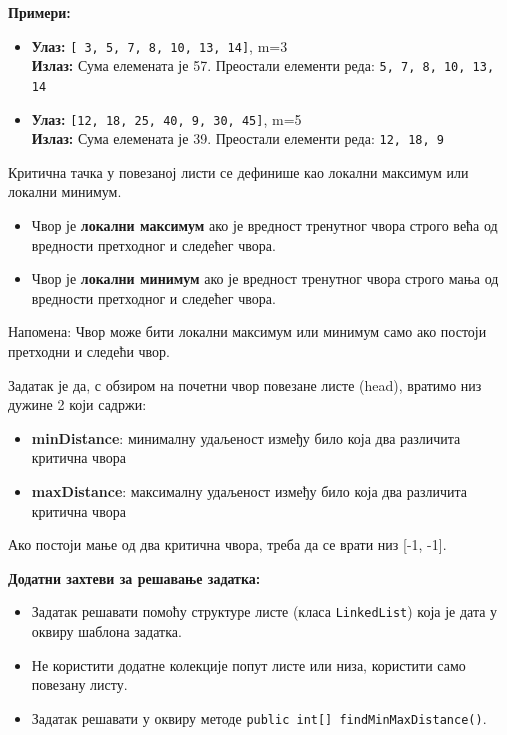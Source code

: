 \textbf{Примери:}
\begin{itemize}
    \item \textbf{Улаз:} \texttt{[ 3, 5, 7, 8, 10, 13, 14]}, m=3 \\
          \textbf{Излаз:} Сума елемената је 57. Преостали елементи реда: \texttt{5, 7, 8, 10, 13, 14}
    \item \textbf{Улаз:} \texttt{[12, 18, 25, 40, 9, 30, 45]}, m=5 \\
          \textbf{Излаз:} Сума елемената је 39. Преостали елементи реда: \texttt{12, 18, 9}
\end{itemize}



Критична тачка у повезаној листи се дефинише као локални максимум или локални минимум.

\begin{itemize}
    \item Чвор је \textbf{локални максимум} ако је вредност тренутног чвора строго већа од вредности претходног и следећег чвора.
    \item Чвор је \textbf{локални минимум} ако је вредност тренутног чвора строго мања од вредности претходног и следећег чвора.
\end{itemize}

Напомена: Чвор може бити локални максимум или минимум само ако постоји претходни и следећи чвор.

Задатак је да, с обзиром на почетни чвор повезане листе (head), вратимо низ дужине 2 који садржи:

\begin{itemize}
    \item \textbf{minDistance}: минималну удаљеност између било која два различита критична чвора
    \item \textbf{maxDistance}: максималну удаљеност између било која два различита критична чвора
\end{itemize}

Ако постоји мање од два критична чвора, треба да се врати низ [-1, -1].

\textbf{Додатни захтеви за решавање задатка:}
\begin{itemize}
    \item Задатак решавати помоћу структуре листе (класа \texttt{LinkedList}) која је дата у оквиру шаблона задатка.
    \item Не користити додатне колекције попут листе или низа, користити само повезану листу.
    \item Задатак решавати у оквиру методе \texttt{public int[] findMinMaxDistance()}.
\end{itemize}

